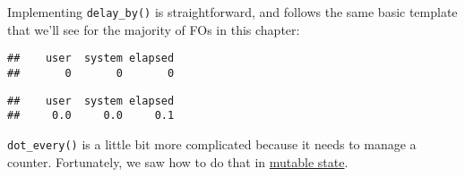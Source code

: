 Implementing \texttt{delay\_by()} is straightforward, and follows the
same basic template that we'll see for the majority of FOs in this
chapter: 

\begin{Shaded}
\begin{Highlighting}[]
\StringTok{ }
\NormalTok{  \}}
\NormalTok{\}}
\NormalTok{(}\NormalTok{(}\NormalTok{))}
\end{Highlighting}
\end{Shaded}

\begin{verbatim}
##    user  system elapsed 
##       0       0       0
\end{verbatim}

\begin{Shaded}
\begin{Highlighting}[]
\NormalTok{(}\NormalTok{(}\NormalTok{))}
\end{Highlighting}
\end{Shaded}

\begin{verbatim}
##    user  system elapsed 
##     0.0     0.0     0.1
\end{verbatim}

\texttt{dot\_every()} is a little bit more complicated because it needs
to manage a counter. Fortunately, we saw how to do that in
\protect\hyperlink{mutable-state}{mutable state}. 

\begin{Shaded}
\end{Shaded}

